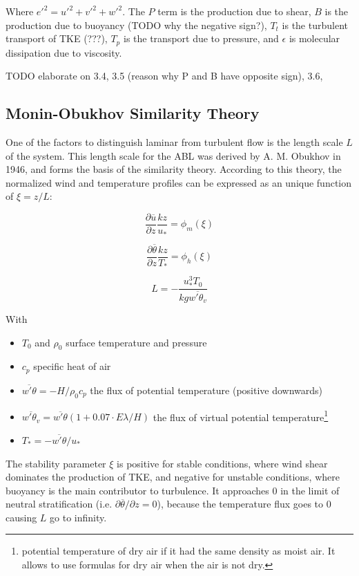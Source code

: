 \documentclass[12pt]{book}
\begin{document}
Where ${e'}^2={u'}^2+{v'}^2+{w'}^2$. The $P$ term is the production due to shear, $B$ is the production due to buoyancy (TODO why the negative sign?), $T_t$ is the turbulent transport of TKE (???), $T_p$ is the transport due to pressure, and $\epsilon$ is molecular dissipation due to viscosity.

TODO elaborate on 3.4, 3.5 (reason why P and B have opposite sign), 3.6, 

\subsection{Monin-Obukhov Similarity Theory}
One of the factors to distinguish laminar from turbulent flow is the length scale $L$ of the system. This length scale for the ABL was derived by A. M. Obukhov in 1946, and forms the basis of the similarity theory. According to this theory, the normalized wind and temperature profiles can be expressed as an unique function of $\xi=z/L$:

$$
\frac{\partial\overline{u}}{\partial z}\frac{kz}{u_*}=\phi_m(\xi)
$$

$$
\frac{\partial\overline{\theta}}{\partial z}\frac{kz}{T_*}=\phi_h(\xi)
$$

$$
L=-\frac{u_*^3 T_0}{kg\overline{w'\theta_v}}
$$

With

\begin{itemize}
\item $T_0$ and $\rho_0$ surface temperature and pressure
\item $c_p$ specific heat of air
\item $\overline{w'\theta}=-H/\rho_0 c_p$ the flux of potential temperature (positive downwards)
\item $\overline{w'\theta_v}=\overline{w'\theta}(1+0.07\cdot E\lambda/H)$ the flux of virtual potential temperature\footnote{potential temperature of dry air if it had the same density as moist air. It allows to use formulas for dry air when the air is not dry.}
\item $T_*=-\overline{w'\theta}/u_*$
\end{itemize}

The stability parameter $\xi$ is positive for stable conditions, where wind shear dominates the production of TKE, and negative for unstable conditions, where buoyancy is the main contributor to turbulence. It approaches 0 in the limit of neutral stratification (i.e. $\partial\overline{\theta}/\partial z=0$), because the temperature flux goes to 0 causing $L$ go to infinity.
\end{document}
